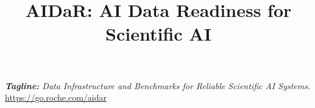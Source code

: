 \documentclass[10pt]{article}
\title{AIDaR: AI Data Readiness for Scientific AI}
\date{}
\newcommand{\currentproposalpart}{Main Workshop Proposal}
\newcommand{\setproposalpart}[1]{\gdef\currentproposalpart{#1}}
\begin{document}
\setproposalpart{PART I -- Main Workshop Proposal}
\maketitle


\vspace{-64pt}
\begin{center}
\textit{\textbf{Tagline: }Data Infrastructure and Benchmarks for Reliable Scientific AI Systems.} \url{https://go.roche.com/aidar}
\end{center}






\end{document}

